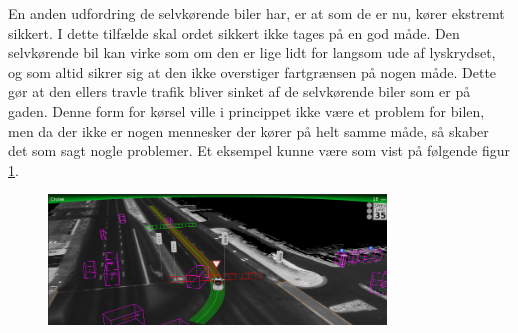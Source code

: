 En anden udfordring de selvkørende biler har, er at som de er nu, kører ekstremt sikkert. I dette tilfælde skal ordet sikkert ikke tages på en god måde. Den selvkørende bil kan virke som om den er lige lidt for langsom ude af lyskrydset, og som altid sikrer sig at den ikke overstiger fartgrænsen på nogen måde. Dette gør at den ellers travle trafik bliver sinket af de selvkørende biler som er på gaden. Denne form for kørsel ville i princippet ikke være et problem for bilen, men da der ikke er nogen mennesker der kører på helt samme måde, så skaber det som sagt nogle problemer. Et eksempel kunne være som vist på følgende figur \ref{fig:car_vision}.

\begin{figure}[h!]
    \centering
    \includegraphics[width=0.8\textwidth]{images/google_vision.png}
    \label{fig:car_vision}
\end{figure}

